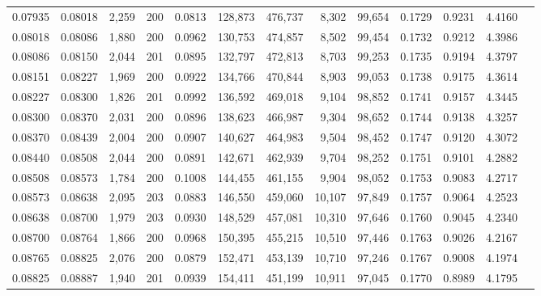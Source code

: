 \begin{tabular}{rrrrrrrrrrrrr}
0.07935 & 0.08018 & 2,259 & 200 &                                     0.0813 & 128,873 & 476,737 &   8,302 &  99,654 & 0.1729 & 0.9231 & 4.4160 \\
0.08018 & 0.08086 & 1,880 & 200 &                                     0.0962 & 130,753 & 474,857 &   8,502 &  99,454 & 0.1732 & 0.9212 & 4.3986 \\
0.08086 & 0.08150 & 2,044 & 201 &                                     0.0895 & 132,797 & 472,813 &   8,703 &  99,253 & 0.1735 & 0.9194 & 4.3797 \\
0.08151 & 0.08227 & 1,969 & 200 &                                     0.0922 & 134,766 & 470,844 &   8,903 &  99,053 & 0.1738 & 0.9175 & 4.3614 \\
0.08227 & 0.08300 & 1,826 & 201 &                                     0.0992 & 136,592 & 469,018 &   9,104 &  98,852 & 0.1741 & 0.9157 & 4.3445 \\
0.08300 & 0.08370 & 2,031 & 200 &                                     0.0896 & 138,623 & 466,987 &   9,304 &  98,652 & 0.1744 & 0.9138 & 4.3257 \\
0.08370 & 0.08439 & 2,004 & 200 &                                     0.0907 & 140,627 & 464,983 &   9,504 &  98,452 & 0.1747 & 0.9120 & 4.3072 \\
0.08440 & 0.08508 & 2,044 & 200 &                                     0.0891 & 142,671 & 462,939 &   9,704 &  98,252 & 0.1751 & 0.9101 & 4.2882 \\
0.08508 & 0.08573 & 1,784 & 200 &                                     0.1008 & 144,455 & 461,155 &   9,904 &  98,052 & 0.1753 & 0.9083 & 4.2717 \\
0.08573 & 0.08638 & 2,095 & 203 &                                     0.0883 & 146,550 & 459,060 &  10,107 &  97,849 & 0.1757 & 0.9064 & 4.2523 \\
0.08638 & 0.08700 & 1,979 & 203 &                                     0.0930 & 148,529 & 457,081 &  10,310 &  97,646 & 0.1760 & 0.9045 & 4.2340 \\
0.08700 & 0.08764 & 1,866 & 200 &                                     0.0968 & 150,395 & 455,215 &  10,510 &  97,446 & 0.1763 & 0.9026 & 4.2167 \\
0.08765 & 0.08825 & 2,076 & 200 &                                     0.0879 & 152,471 & 453,139 &  10,710 &  97,246 & 0.1767 & 0.9008 & 4.1974 \\
0.08825 & 0.08887 & 1,940 & 201 &                                     0.0939 & 154,411 & 451,199 &  10,911 &  97,045 & 0.1770 & 0.8989 & 4.1795 \\

\end{tabular}
